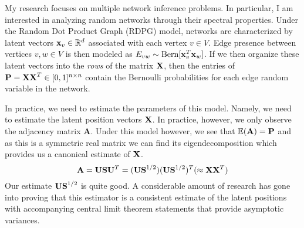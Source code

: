 \documentclass[12pt]{article}
\begin{document}
My research focuses on multiple network inference problems. In particular, I am interested in analyzing random networks through their spectral properties. Under the Random Dot Product Graph (RDPG) model, networks are characterized by latent vectors $\mathbf{x}_v\in\mathbb{R}^{d}$ associated with each vertex $v\in V$. Edge presence between vertices $v,w\in V$ is then modeled as $E_{vw}\sim\text{Bern}[\mathbf{x}_v^T\mathbf{x}_w]$. If we then organize these latent vectors into the \textit{rows} of the matrix $\mathbf{X}$, then the entries of $\mathbf{P} = \mathbf{XX}^T\in[0,1]^{n\times n}$ contain the Bernoulli probabilities for each edge random variable in the network.

In practice, we need to estimate the parameters of this model. Namely, we need to estimate the latent position vectors $\mathbf{X}$. In practice, however, we only observe the adjacency matrix $\mathbf{A}$. Under this model however, we see that ${\mathbb{E}}(\mathbf{A}) = \mathbf{P}$ and as this is a symmetric real matrix we can find its eigendecomposition which provides us a canonical estimate of $\mathbf{X}$. 
{}\begin{equation}
    \mathbf{A} = \mathbf{USU}^T = (\mathbf{US}^{1/2})(\mathbf{US}^{1/2})^T (\approx \mathbf{XX}^T)  
\end{equation}
Our estimate $\mathbf{US}^{1/2}$ is quite good. A considerable amount of research has gone into proving that this estimator is a consistent estimate of the latent positions with accompanying central limit theorem statements that provide asymptotic variances. 
\end{document}
